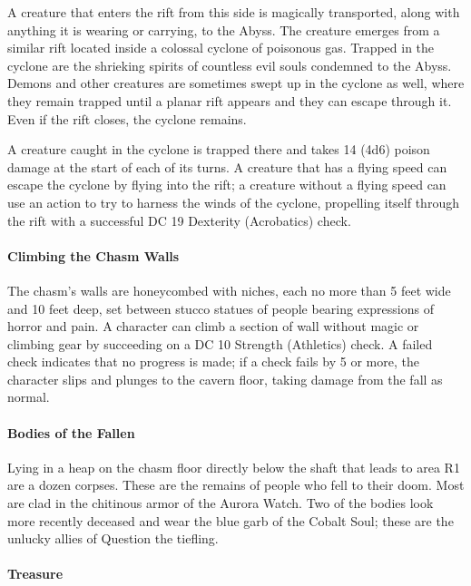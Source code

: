 \documentclass[letterpaper, 11pt, bg=full, twocolumn]{dndbook}
\begin{document}
A creature that enters the rift from this side is magically transported, along with anything it is wearing or carrying, to the Abyss. The creature emerges from a similar rift located inside a colossal cyclone of poisonous gas. Trapped in the cyclone are the shrieking spirits of countless evil souls condemned to the Abyss. Demons and other creatures are sometimes swept up in the cyclone as well, where they remain trapped until a planar rift appears and they can escape through it. Even if the rift closes, the cyclone remains.

A creature caught in the cyclone is trapped there and takes 14 (4d6) poison damage at the start of each of its turns. A creature that has a flying speed can escape the cyclone by flying into the rift; a creature without a flying speed can use an action to try to harness the winds of the cyclone, propelling itself through the rift with a successful DC 19 Dexterity (Acrobatics) check.

\paragraph{Climbing the Chasm Walls}

The chasm's walls are honeycombed with niches, each no more than 5 feet wide and 10 feet deep, set between stucco statues of people bearing expressions of horror and pain. A character can climb a section of wall without magic or climbing gear by succeeding on a DC 10 Strength (Athletics) check. A failed check indicates that no progress is made; if a check fails by 5 or more, the character slips and plunges to the cavern floor, taking damage from the fall as normal.

\paragraph{Bodies of the Fallen}

Lying in a heap on the chasm floor directly below the shaft that leads to area R1 are a dozen corpses. These are the remains of people who fell to their doom. Most are clad in the chitinous armor of the Aurora Watch. Two of the bodies look more recently deceased and wear the blue garb of the Cobalt Soul; these are the unlucky allies of Question the tiefling.

\paragraph{Treasure}
\end{document}
